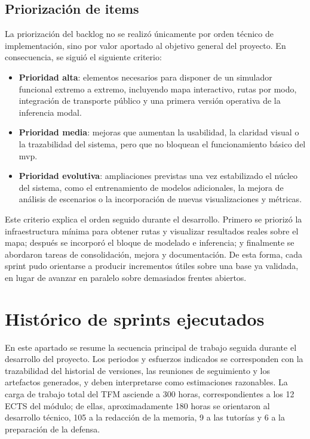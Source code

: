 \subsection{Priorización de items}

La priorización del backlog no se realizó únicamente por orden técnico de implementación, sino por valor aportado al objetivo general del proyecto. En consecuencia, se siguió el siguiente criterio:
\begin{itemize}
  \item \textbf{Prioridad alta}: elementos necesarios para disponer de un simulador funcional extremo a extremo, incluyendo mapa interactivo, rutas por modo, integración de transporte público y una primera versión operativa de la inferencia modal.
  \item \textbf{Prioridad media}: mejoras que aumentan la usabilidad, la claridad visual o la trazabilidad del sistema, pero que no bloquean el funcionamiento básico del \gls{mvp}.
  \item \textbf{Prioridad evolutiva}: ampliaciones previstas una vez estabilizado el núcleo del sistema, como el entrenamiento de modelos adicionales, la mejora de análisis de escenarios o la incorporación de nuevas visualizaciones y métricas.
\end{itemize}

Este criterio explica el orden seguido durante el desarrollo. Primero se priorizó la infraestructura mínima para obtener rutas y visualizar resultados reales sobre el mapa; después se incorporó el bloque de modelado e inferencia; y finalmente se abordaron tareas de consolidación, mejora y documentación. De esta forma, cada sprint pudo orientarse a producir incrementos útiles sobre una base ya validada, en lugar de avanzar en paralelo sobre demasiados frentes abiertos.
\newpage

\section{Histórico de sprints ejecutados}

En este apartado se resume la secuencia principal de trabajo seguida durante el desarrollo del proyecto. Los periodos y esfuerzos indicados se corresponden con la trazabilidad del historial de versiones, las reuniones de seguimiento y los artefactos generados, y deben interpretarse como estimaciones razonables. La carga de trabajo total del TFM asciende a 300 horas, correspondientes a los 12 ECTS del módulo; de ellas, aproximadamente 180 horas se orientaron al desarrollo técnico, 105 a la redacción de la memoria, 9 a las tutorías y 6 a la preparación de la defensa.


